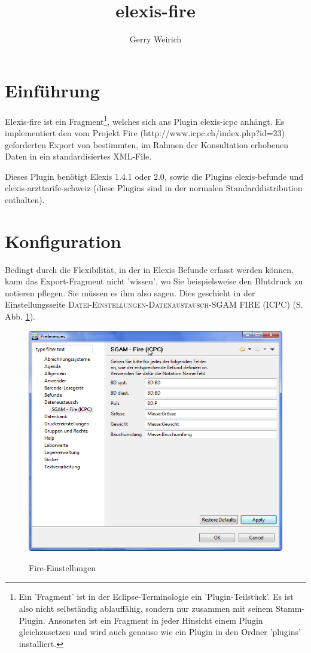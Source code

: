 \documentclass[a4paper]{scrartcl}
\begin{document}
\title{elexis-fire}
\author{Gerry Weirich}
\maketitle

\section{Einführung}
Elexis-fire ist ein Fragment\footnote{Ein 'Fragment' ist in der Eclipse-Terminologie ein 'Plugin-Teilstück'. Es ist also nicht selbständig ablauffähig, sondern nur zusammen mit seinem Stamm-Plugin. Ansonsten ist ein Fragment in jeder Hinsicht einem Plugin gleichzusetzen und wird auch genauso wie ein Plugin in den Ordner 'plugins' installiert.}, welches sich ans Plugin elexis-icpc anhängt. Es implementiert den vom Projekt Fire (http://www.icpc.ch/index.php?id=23) geforderten Export von bestimmten, im Rahmen der Konsultation erhobenen Daten in ein standardisiertes XML-File.

\medskip

Dieses Plugin benötigt Elexis 1.4.1 oder 2.0, sowie die Plugins elexis-befunde und elexis-arzttarife-schweiz (diese Plugins sind in der normalen Standarddistribution enthalten).

\section{Konfiguration}
Bedingt durch die Flexibilität, in der in Elexis Befunde erfasst werden können, kann das Export-Fragment nicht 'wissen', wo Sie beispielsweise den Blutdruck zu notieren pflegen. Sie müssen es ihm also sagen. Dies geschieht in der Einstellungsseite \textsc{Datei-Einstellungen-Datenaustausch-SGAM FIRE (ICPC)} (S. Abb. \ref{fire:fig1}).
\begin{figure}
  \includegraphics{fire1}\\
  \caption{Fire-Einstellungen}\label{fire:fig1}
\end{figure}
\end{document}
